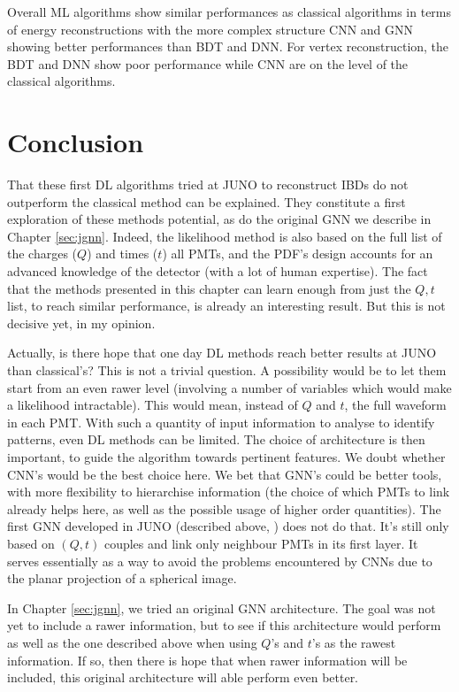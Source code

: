 \documentclass[../main.tex]{subfiles}
\begin{document}
Overall ML algorithms show similar performances as classical algorithms in terms of energy reconstructions with the more complex structure CNN and GNN showing better performances than BDT and DNN. For vertex reconstruction, the BDT and DNN show poor performance while CNN are on the level of the classical algorithms.

\section{Conclusion}

That these first DL algorithms tried at JUNO to reconstruct IBDs do not outperform the classical method can be explained. They constitute a first exploration of these methods potential, as do the original GNN we describe in Chapter \ref{sec:jgnn}. Indeed, the likelihood method is also based on the full list of the charges ($Q$) and times ($t$) all PMTs, and the PDF's design accounts for an advanced knowledge of the detector (with a lot of human expertise). The fact that the methods presented in this chapter can learn enough from just the $Q,t$ list, to reach similar performance, is already an interesting result. But this is not decisive yet, in my opinion.

Actually, is there hope that one day DL methods reach better results at JUNO than classical's? This is not a trivial question. A possibility would be to let them start from an even rawer level (involving a number of variables which would make a likelihood intractable). This would mean, instead of $Q$ and $t$, the full waveform in each PMT. With such a quantity of input information to analyse to identify patterns, even DL methods can be limited. The choice of architecture is then important, to guide the algorithm towards pertinent features. We doubt whether CNN's would be the best choice here. We bet that GNN's could be better tools, with more flexibility to hierarchise information (the choice of which PMTs to link already helps here, as well as the possible usage of higher order quantities). The first GNN developed in JUNO (described above, \cite{qian_vertex_2021}) does not do that. It's still only based on $(Q,t)$ couples and link only neighbour PMTs in its first layer. It serves essentially as a way to avoid the problems encountered by CNNs due to the planar projection of a spherical image.

In Chapter \ref{sec:jgnn}, we tried an original GNN architecture. The goal was not yet to include a rawer information, but to see if this architecture would perform as well as the one described above when using $Q$'s and $t$'s as the rawest information. If so, then there is hope that when rawer information will be included, this original architecture will able perform even better.
\end{document}
